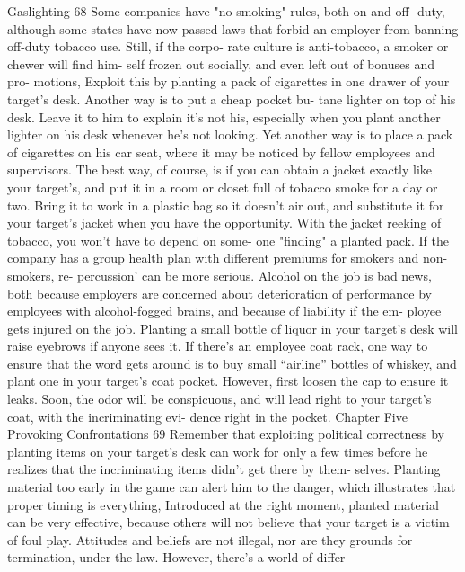 \documentclass{book}
\begin{document}
Gaslighting 
68 
Some companies have "no-smoking" rules, both on and off- 
duty, although some states have now passed laws that forbid an 
employer from banning off-duty tobacco use. Still, if the corpo- 
rate culture is anti-tobacco, a smoker or chewer will find him- 
self frozen out socially, and even left out of bonuses and pro- 
motions, 
Exploit this by planting a pack of cigarettes in one drawer 
of your target's desk. Another way is to put a cheap pocket bu- 
tane lighter on top of his desk. Leave it to him to explain it's not 
his, especially when you plant another lighter on his desk 
whenever he's not looking. Yet another way is to place a pack 
of cigarettes on his car seat, where it may be noticed by fellow 
employees and supervisors. The best way, of course, is if you 
can obtain a jacket exactly like your target's, and put it in a 
room or closet full of tobacco smoke for a day or two. Bring it 
to work in a plastic bag so it doesn't air out, and substitute it for 
your target's jacket when you have the opportunity. With the 
jacket reeking of tobacco, you won't have to depend on some- 
one "finding" a planted pack. If the company has a group health 
plan with different premiums for smokers and non-smokers, re- 
percussion’ can be more serious. 
Alcohol on the job is bad news, both because employers are 
concerned about deterioration of performance by employees 
with alcohol-fogged brains, and because of liability if the em- 
ployee gets injured on the job. Planting a small bottle of liquor 
in your target's desk will raise eyebrows if anyone sees it. If 
there's an employee coat rack, one way to ensure that the word 
gets around is to buy small “airline” bottles of whiskey, and 
plant one in your target's coat pocket. However, first loosen the 
cap to ensure it leaks. Soon, the odor will be conspicuous, and 
will lead right to your target's coat, with the incriminating evi- 
dence right in the pocket. 
Chapter Five 
Provoking Confrontations 
69 
Remember that exploiting political correctness by planting 
items on your target's desk can work for only a few times before 
he realizes that the incriminating items didn't get there by them- 
selves. Planting material too early in the game can alert him to 
the danger, which illustrates that proper timing is everything, 
Introduced at the right moment, planted material can be very 
effective, because others will not believe that your target is a 
victim of foul play. 
Attitudes and beliefs are not illegal, nor are they grounds for 
termination, under the law. However, there's a world of differ- 
\end{document}
